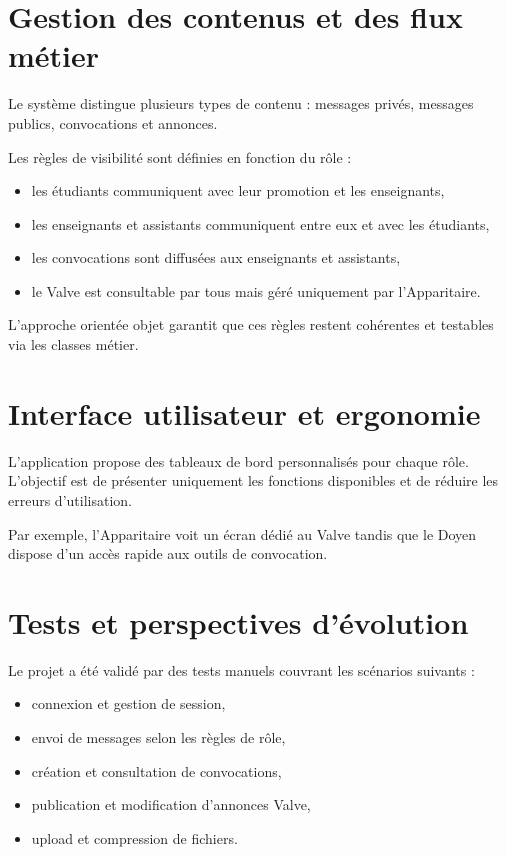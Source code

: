 \documentclass[12pt,a4paper]{article}
\begin{document}
\section{Gestion des contenus et des flux métier}
Le système distingue plusieurs types de contenu : messages privés, messages publics, convocations et annonces.

Les règles de visibilité sont définies en fonction du rôle :
\begin{itemize}
  \item les étudiants communiquent avec leur promotion et les enseignants,
  \item les enseignants et assistants communiquent entre eux et avec les étudiants,
  \item les convocations sont diffusées aux enseignants et assistants,
  \item le Valve est consultable par tous mais géré uniquement par l'Apparitaire.
\end{itemize}

L'approche orientée objet garantit que ces règles restent cohérentes et testables via les classes métier.

\section{Interface utilisateur et ergonomie}
L'application propose des tableaux de bord personnalisés pour chaque rôle. L'objectif est de présenter uniquement les fonctions disponibles et de réduire les erreurs d'utilisation.

Par exemple, l'Apparitaire voit un écran dédié au Valve tandis que le Doyen dispose d'un accès rapide aux outils de convocation.

\section{Tests et perspectives d'évolution}
Le projet a été validé par des tests manuels couvrant les scénarios suivants :
\begin{itemize}
  \item connexion et gestion de session,
  \item envoi de messages selon les règles de rôle,
  \item création et consultation de convocations,
  \item publication et modification d'annonces Valve,
  \item upload et compression de fichiers.
\end{itemize}
\end{document}
